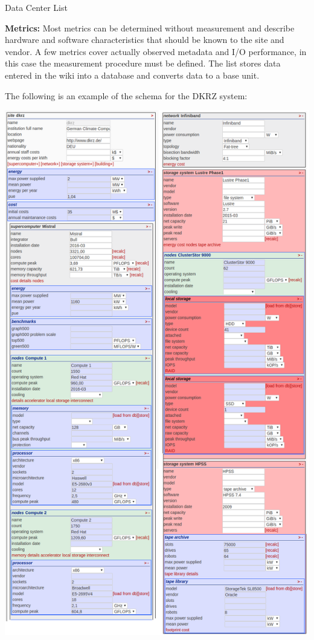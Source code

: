 \documentclass[portrait,a0paper,fontscale=0.4]{baposter}
\begin{document}
\begin{poster}
\begin{posterbox}[name=schedule,column=2,span=1, above=bottom, below=io500]{Data Center List}
\vspace*{-1em}


\textbf{Metrics:} Most metrics can be determined without measurement and describe hardware and software characteristics that should be known to the site and vendor. A few metrics cover actually observed metadata and I/O performance, in this case the measurement procedure must be defined.
The list stores data entered in the wiki into a database and converts data to a base unit.

The following is an example of the schema for the DKRZ system:

\vspace*{-0.65em}

\includegraphics[width=\textwidth]{schema}


\end{posterbox}
\end{poster}
\end{document}
